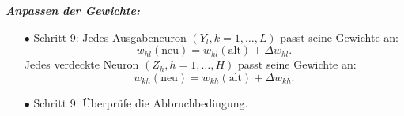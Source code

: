 \textbf{\textit{Anpassen der Gewichte:}}
\begin{itemize}
\item[\textbf{$\bullet$}] Schritt 9: Jedes Ausgabeneuron $(Y_{l}, k=1,\dots,L)$ passt seine Gewichte an: 
\begin{equation*}
w_{hl}(\text{neu})=w_{hl}(\text{alt})+\Delta w_{hl}.
\end{equation*}
Jedes verdeckte Neuron $(Z_{h}, h=1,\dots,H)$ passt seine Gewichte an:
\begin{equation*}
w_{kh}(\text{neu})=w_{kh}(\text{alt})+\Delta w_{kh}.
\end{equation*}

\item[\textbf{$\bullet$}] Schritt 9: Überprüfe die Abbruchbedingung.
\end{itemize}

 